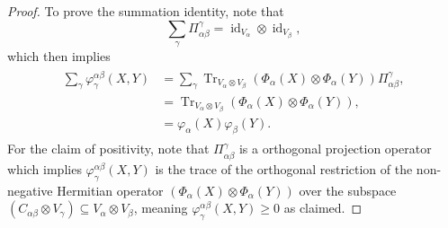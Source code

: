 \documentclass[notitlepage, 11pt, letterpaper]{amsart}
\theoremstyle{plain}
\theoremstyle{definition}
\DeclareMathOperator{\Tr}{Tr}
\DeclareMathOperator{\id}{id}
\newcommand{\ot}{\otimes} %
\newcommand{\vp}{\varphi} %
\newcommand{\ya}{\alpha}
\newcommand{\yb}{\beta}
\newcommand{\yc}{\gamma}
\begin{document}
\begin{proof}
    To prove the summation identity, note that
    \begin{equation}
        \sum_{\yc} \Pi_{\ya\yb}^\yc = \id_{V_{\ya}} \ot \id_{V_{\yb}},
    \end{equation}
    which then implies
    \begin{align}
        \begin{split}
            \sum_\yc \vp^{\ya \yb}_\yc(X, Y)
            &= \sum_\yc \Tr_{V_\ya \ot V_\yb}  (\Phi_\ya(X) \ot \Phi_\ya(Y))\Pi_{\ya\yb}^\yc, \\
            &= \Tr_{V_\ya \ot V_\yb} (\Phi_\ya(X) \ot \Phi_\ya(Y)), \\
            &= \vp_\ya(X) \vp_\yb(Y).
        \end{split}
    \end{align}
    For the claim of positivity, note that $\Pi_{\ya\yb}^\yc$ is a orthogonal projection operator which implies $\vp^{\ya \yb}_\yc(X, Y)$ is the trace of the orthogonal restriction of the non-negative Hermitian operator $(\Phi_\ya(X) \ot \Phi_\ya(Y))$ over the subspace $(C_{\ya \yb} \ot V_\yc) \subseteq V_\ya \ot V_\yb$, meaning $\vp^{\ya \yb}_\yc(X, Y) \geq 0$ as claimed.
\end{proof}
\end{document}
